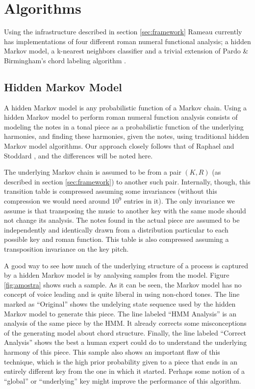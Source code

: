 \section{Algorithms}
\label{sec:algorithms}

Using the infrastructure described in section \ref{sec:framework}
Rameau currently has implementations of four different roman numeral
functional analysis; a hidden Markov model, a k-nearest neighbors
classifier and a trivial extension of Pardo \& Birmingham's chord
labeling algorithm \cite{pardo.ea99:automated}.

\subsection{Hidden Markov Model}
\label{sec:hidden-markov-model}

A hidden Markov model is any probabilistic function of a Markov
chain. Using a hidden Markov model to perform roman numeral function
analysis consists of modeling the notes in a tonal piece as a
probabilistic function of the underlying harmonies, and finding these
harmonies, given the notes, using traditional hidden Markov model
algorithms. Our approach closely follows that of Raphael and Stoddard
\cite{raphael.ea03:harmonic}, and the differences will be noted here.

The underlying Markov chain is assumed to be from a pair $(K,R)$ (as
described in section \ref{sec:framework}) to another such
pair. Internally, though, this transition table is compressed assuming
some invariances (without this compression we would need around $10^9$
entries in it). The only invariance we assume is that transposing the
music to another key with the same mode should not change its
analysis. The notes found in the actual piece are assumed to be
independently and identically drawn from a distribution particular to
each possible key and roman function. This table is also compressed
assuming a transposition invariance on the key pitch. 

A good way to see how much of the underlying structure of a process is
captured by a hidden Markov model is by analysing samples from the
model. Figure \ref{fig:amostra} shows such a sample.  As it can be seen, the Markov model has no concept of voice
leading and is quite liberal in using non-chord tones. The line marked
as ``Original'' shows the undelying state sequence used by the hidden
Markov model to generate this piece. The line labeled ``HMM Analysis''
is an analysis of the same piece by the HMM. It already corrects some
misconceptions of the generating model about chord structure. Finally,
the line labeled ``Correct Analysis'' shows the best a human expert
could do to understand the underlying harmony of this piece. This
sample also shows an important flaw of this technique, which is the
high prior probability given to a piece that ends in an entirely
different key from the one in which it started. Perhaps some notion of
a ``global'' or ``underlying'' key might improve the performance of
this algorithm.

